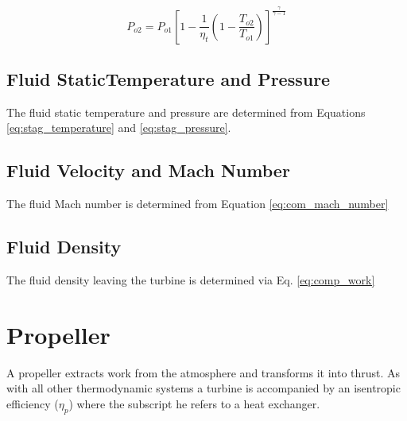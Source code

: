\begin{equation}
\label{eq:turb_stag_pres}
P_{o2} = P_{o1}\left[1 - \frac{1}{\eta_t}\left(1 - \frac{T_{o2}}{T_{o1}} \right) \right]^{\frac{\gamma}{\gamma - 1}}
\end{equation}

\subsection{Fluid StaticTemperature and Pressure}
The fluid static temperature and pressure are determined from Equations  \ref{eq:stag_temperature} and \ref{eq:stag_pressure}.

\subsection{Fluid Velocity and Mach Number}
The fluid Mach number is determined from Equation \ref{eq:com_mach_number}

\subsection{Fluid Density}
The fluid density leaving the turbine is determined via Eq. \ref{eq:comp_work}

\section{Propeller}
A propeller extracts work from the atmosphere and transforms it into thrust. As with all other thermodynamic systems a turbine is accompanied 
by an isentropic efficiency ($\eta_{p}$) where the subscript he refers to a heat exchanger.

